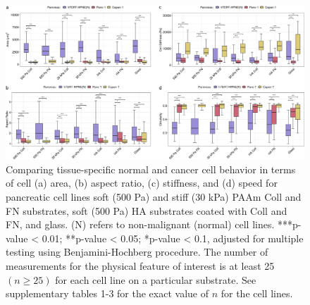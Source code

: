 \documentclass[11pt,letterpaper,english,oneside]{article} %
\begin{document}
\begin{figure}[H]
    \hspace*{-0.8cm}
    \centering
    \includegraphics{../Figures/Supplementary_Figure8/supplementary_figure8.png}
    \caption{Comparing tissue-specific normal and cancer cell behavior in terms of cell (a) area, (b) aspect ratio, (c) stiffness, and (d) speed for pancreatic cell lines 
    soft (500 Pa) and stiff (30 kPa) PAAm Coll and FN substrates, soft (500 Pa) HA substrates coated with Coll and FN, and glass. (N) refers to non-malignant (normal) cell lines.
    ***p-value < 0.01; **p-value < 0.05; *p-value < 0.1, adjusted for multiple testing using Benjamini-Hochberg procedure. 
    The number of measurements for the physical feature of interest is at least 25 $(n \geq 25)$ for each cell line on a particular substrate. 
    See supplementary tables 1-3 for the exact value of $n$ for the cell lines.}
    \label{fig:fig8}
\end{figure}
\end{document}
